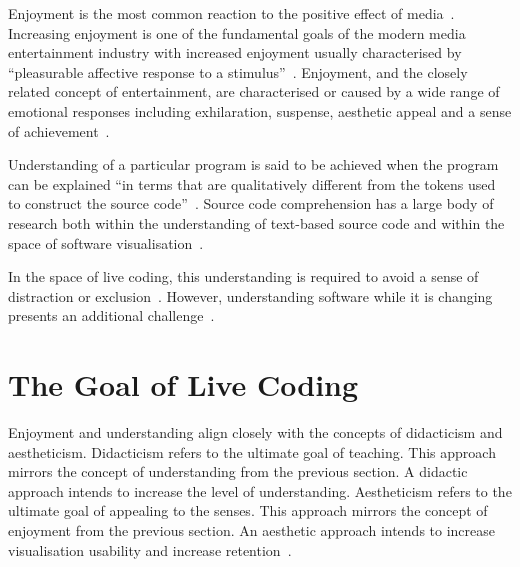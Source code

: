 Enjoyment is the most common reaction to the positive effect of media~\cite{Vorderer2004}. Increasing enjoyment is one of the fundamental goals of the modern media entertainment industry with increased enjoyment usually characterised by ``pleasurable affective response to a stimulus''~\cite{Brock2004}. Enjoyment, and the closely related concept of entertainment, are characterised or caused by a wide range of emotional responses including exhilaration, suspense, aesthetic appeal and a sense of achievement~\cite{Vorderer2004}. 

Understanding of a particular program is said to be achieved when the program can be explained ``in terms that are qualitatively different from the tokens used to construct the source code''~\cite{Biggerstaff1994}. Source code comprehension has a large body of research both within the understanding of text-based source code and within the space of software visualisation~\cite{Hosking2005}.

In the space of live coding, this understanding is required to avoid a sense of distraction or exclusion~\cite{McLean2010a}. However, understanding software while it is changing presents an additional challenge~\cite{Eisenbarth2003}.


\section{The Goal of Live Coding}

\more

Enjoyment and understanding align closely with the concepts of didacticism and aestheticism. Didacticism refers to the ultimate goal of teaching. This approach mirrors the concept of understanding from the previous section. A didactic approach intends to increase the level of understanding. Aestheticism refers to the ultimate goal of appealing to the senses. This approach mirrors the concept of enjoyment from the previous section. An aesthetic approach intends to increase visualisation usability and increase retention~\cite{Cawthon2007}. 

